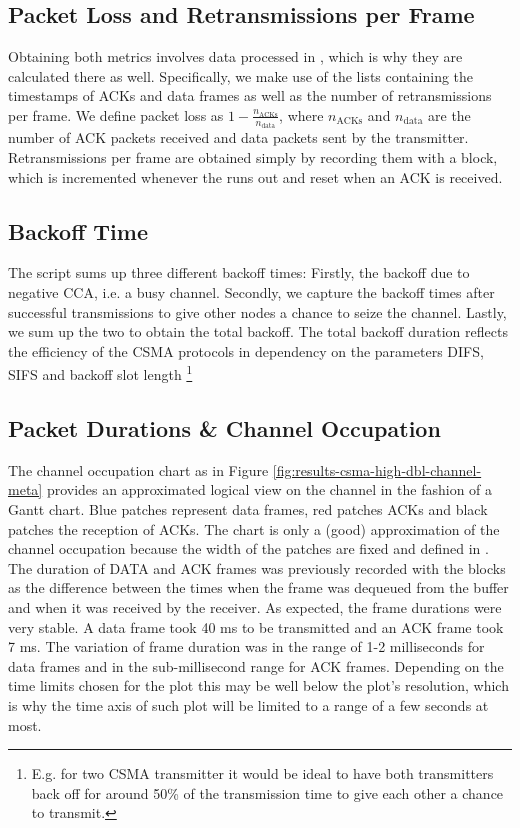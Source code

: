 \subsection{Packet Loss and Retransmissions per Frame}

Obtaining both metrics involves data processed in , which is why they are calculated there as well. Specifically, we make use of the lists containing the timestamps of ACKs and data frames as well as the number of retransmissions per frame. 
We define packet loss as $ 1 - \frac{n_\text{ACKs}}{n_\text{data}} $, where $ n_\text{ACKs} $ and $ n_\text{data} $ are the number of ACK packets received and data packets sent by the transmitter.
Retransmissions per frame are obtained simply by recording them with a  block, which is incremented whenever the  runs out and reset when an ACK is received.

\subsection{Backoff Time}

The script  sums up three different backoff times: Firstly, the backoff due to negative CCA, i.e. a busy channel. Secondly, we capture the backoff times after successful transmissions to give other nodes a chance to seize the channel. Lastly, we sum up the two to obtain the total backoff. The total backoff duration reflects the efficiency of the CSMA protocols in dependency on the parameters DIFS, SIFS and backoff slot length \footnote{E.g. for two CSMA transmitter it would be ideal to have both transmitters back off for around 50\% of the transmission time to give each other a chance to transmit.}

\subsection{Packet Durations \& Channel Occupation}

The channel occupation chart as in Figure \ref{fig:results-csma-high-dbl-channel-meta} provides an approximated logical view on the channel in the fashion of a Gantt chart. Blue patches represent data frames, red patches ACKs and black patches the reception of ACKs. The chart is only a (good) approximation of the channel occupation because the width of the patches are fixed and defined in . The duration of DATA and ACK frames was previously recorded with the  blocks as the difference between the times when the frame was dequeued from the buffer and when it was received by the receiver. As expected, the frame durations were very stable. A data frame took 40 ms to be transmitted and an ACK frame took 7 ms. The variation of frame duration was in the range of 1-2  milliseconds for data frames and in the sub-millisecond range for ACK frames. Depending on the time limits chosen for the plot this may be well below the plot's resolution, which is why the time axis of such plot will be limited to a range of a few seconds at most.


